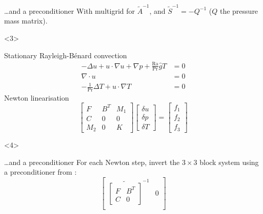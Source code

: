 \documentclass[presentation,aspectratio=43, 10pt]{beamer}
\begin{document}
\begin{frame}[t]
\begin{onlyenv}
\begin{block}{\dots and a preconditioner}
      With multigrid for $\tilde{A}^{-1}$, and
      $\tilde{S}^{-1} = -Q^{-1}$ ($Q$ the pressure mass matrix).
    \end{block}
  \end{onlyenv}
  \begin{onlyenv}<3>
    \begin{block}{Stationary Rayleigh-B\'enard convection}
      \begin{equation*}
        \begin{split}
          -\Delta u + u\cdot\nabla u + \nabla p +
          \frac{\text{Ra}}{\text{Pr}} \hat{g}T &= 0 \\
          \nabla \cdot u &= 0 \\
          - \frac{1}{\text{Pr}} \Delta T + u\cdot \nabla T &= 0
        \end{split}
      \end{equation*}
      Newton linearisation
      \begin{equation*}
        \begin{bmatrix}
          F   & B^T & M_1 \\
          C   & 0   & 0   \\
          M_2 & 0 & K
        \end{bmatrix}
        \begin{bmatrix}
          \delta u \\
          \delta p \\
          \delta T
        \end{bmatrix} =
        \begin{bmatrix}
          f_1 \\
          f_2 \\
          f_3
        \end{bmatrix}
      \end{equation*}
    \end{block}
  \end{onlyenv}
  \begin{onlyenv}<4>
    \begin{block}{\dots and a preconditioner}
      {\small For each Newton step, invert the $3\times 3$ block
        system using a preconditioner from \textcite{Howle:2012}:
        \begin{equation*}
          \begin{bmatrix}
            \widetilde{\begin{bmatrix}
                F & B^T\\
                C & 0
              \end{bmatrix}}^{-1} & 0\\

\end{bmatrix}
\end{equation*}}
\end{block}
\end{onlyenv}
\end{frame}
\end{document}
